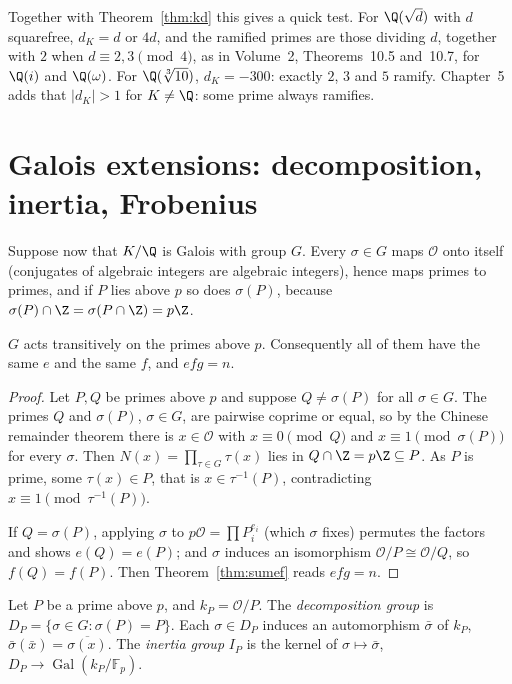 Together with Theorem~\ref{thm:kd} this gives a quick test. For $\Q(\sqrt d)$ with $d$ squarefree, $d_K=d$ or $4d$, and
the ramified primes are those dividing $d$, together with $2$ when $d\equiv2,3\pmod4$, as in Volume~2, Theorems~10.5 and~10.7, for $\Q(i)$ and $\Q(\omega)$. For
$\Q(\sqrt[3]{10})$, $d_K=-300$: exactly $2$, $3$ and $5$ ramify. Chapter~5 adds that $|d_K|>1$ for $K\ne\Q$: some prime
always ramifies.

\section{Galois extensions: decomposition, inertia, Frobenius}

Suppose now that $K/\Q$ is Galois with group $G$. Every $\sigma\in G$ maps $\mathcal O$ onto itself (conjugates of
algebraic integers are algebraic integers), hence maps primes to primes, and if $P$ lies above $p$ so does $\sigma(P)$,
because $\sigma(P)\cap\Z=\sigma(P\cap\Z)=p\Z$.

\begin{theorem}\label{thm:transitive}
$G$ acts transitively on the primes above $p$. Consequently all of them have the same $e$ and the same $f$, and
$efg=n$.
\end{theorem}
\begin{proof}
Let $P,Q$ be primes above $p$ and suppose $Q\ne\sigma(P)$ for all $\sigma\in G$. The primes $Q$ and $\sigma(P)$, $\sigma\in
G$, are pairwise coprime or equal, so by the Chinese remainder theorem there is $x\in\mathcal O$ with $x\equiv0\pmod Q$
and $x\equiv1\pmod{\sigma(P)}$ for every $\sigma$. Then $N(x)=\prod_{\tau\in G}\tau(x)$ lies in $Q\cap\Z=p\Z\subseteq P$.
As $P$ is prime, some $\tau(x)\in P$, that is $x\in\tau^{-1}(P)$, contradicting $x\equiv1\pmod{\tau^{-1}(P)}$.

If $Q=\sigma(P)$, applying $\sigma$ to $p\mathcal O=\prod P_i^{e_i}$ (which $\sigma$ fixes) permutes the factors and
shows $e(Q)=e(P)$; and $\sigma$ induces an isomorphism $\mathcal O/P\cong\mathcal O/Q$, so $f(Q)=f(P)$. Then
Theorem~\ref{thm:sumef} reads $efg=n$.
\end{proof}

\begin{definition}
Let $P$ be a prime above $p$, and $k_P=\mathcal O/P$. The \emph{decomposition group} is $D_P=\{\sigma\in G:\sigma(P)=P\}$.
Each $\sigma\in D_P$ induces an automorphism $\bar\sigma$ of $k_P$, $\bar\sigma(\bar x)=\overline{\sigma(x)}$. The
\emph{inertia group} $I_P$ is the kernel of $\sigma\mapsto\bar\sigma$, $D_P\to\operatorname{Gal}(k_P/\mathbb F_p)$.
\end{definition}


